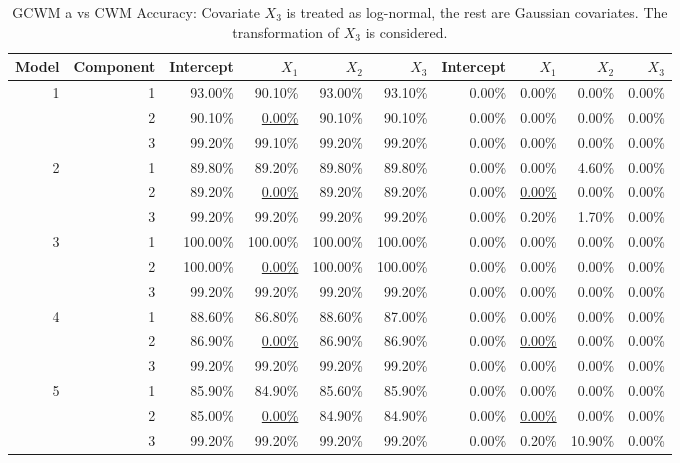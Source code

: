 \documentclass[11pt,letterpaper]{article}
\numberwithin{equation}{section}
\numberwithin{equation}{section}
\numberwithin{equation}{section}
\begin{document}
\begin{center}
\begin{table}[!htb]
\label{my-label}
\caption{GCWM a vs CWM Accuracy: Covariate $X_3$ is treated as log-normal, the rest are Gaussian covariates. The transformation of $X_3$ is considered.}
\begin{adjustwidth}{-1cm}{}
\begin{tabular}{|rrrrrr|rrrr|}
\hline\hline
Model & Component & Intercept & $X_1$ &$X_2$ & $X_3$& Intercept & $X_1$ &$X_2$ & $X_3$  \\
\hline
1     & 1         & 93.00\%   & 90.10\%  & 93.00\%  & 93.10\% & 0.00\% & 0.00\% & 0.00\% & 0.00\%   \\
      & 2         & 90.10\%   & \underline{0.00\%}   & 90.10\%  & 90.10\% & 0.00\% & 0.00\% & 0.00\% & 0.00\%  \\
      & 3         & 99.20\%   & 99.10\%  & 99.20\%  & 99.20\% & 0.00\% & 0.00\% & 0.00\% & 0.00\%  \\ 
2     & 1         & 89.80\%   & 89.20\%  & 89.80\%  & 89.80\% & 0.00\% & 0.00\% & 4.60\% & 0.00\%  \\
      & 2         & 89.20\%   &\underline{0.00\%}   & 89.20\%  & 89.20\% & 0.00\% & \underline{0.00\%} & 0.00\% & 0.00\%   \\
      & 3         & 99.20\%   & 99.20\%  & 99.20\%  & 99.20\% & 0.00\% & 0.20\% & 1.70\% & 0.00\%  \\ 
3     & 1         & 100.00\%  & 100.00\% & 100.00\% & 100.00\%  & 0.00\% & 0.00\% & 0.00\% & 0.00\% \\
      & 2         & 100.00\%  & \underline{0.00\%}   & 100.00\% & 100.00\% & 0.00\% & 0.00\% & 0.00\% & 0.00\% \\
      & 3         & 99.20\%   & 99.20\%  & 99.20\%  & 99.20\%  & 0.00\% & 0.00\% & 0.00\% & 0.00\%\\ 
      4 & 1 & 88.60\% & 86.80\% & 88.60\% & 87.00\%  & 0.00\% & 0.00\% & 0.00\%  & 0.00\%  \\
  & 2 & 86.90\% &\underline{ 0.00\%}  & 86.90\% & 86.90\% & 0.00\% & \underline{0.00\%} & 0.00\%  & 0.00\%  \\
  & 3 & 99.20\% & 99.20\% & 99.20\% & 99.20\% & 0.00\% & 0.00\% & 0.00\%  & 0.00\% \\ 
5 & 1 & 85.90\% & 84.90\% & 85.60\% & 85.90\% & 0.00\% & 0.00\% & 0.00\%  & 0.00\% \\
  & 2 & 85.00\% &\underline{ 0.00\%}  & 84.90\% & 84.90\% & 0.00\% & \underline{0.00\%} & 0.00\%  & 0.00\%  \\
  & 3 & 99.20\% & 99.20\% & 99.20\% & 99.20\% & 0.00\% & 0.20\% & 10.90\% & 0.00\% \\
      \hline\hline
\end{tabular}
\end{adjustwidth}
\end{table}
\end{center}
\end{document}
